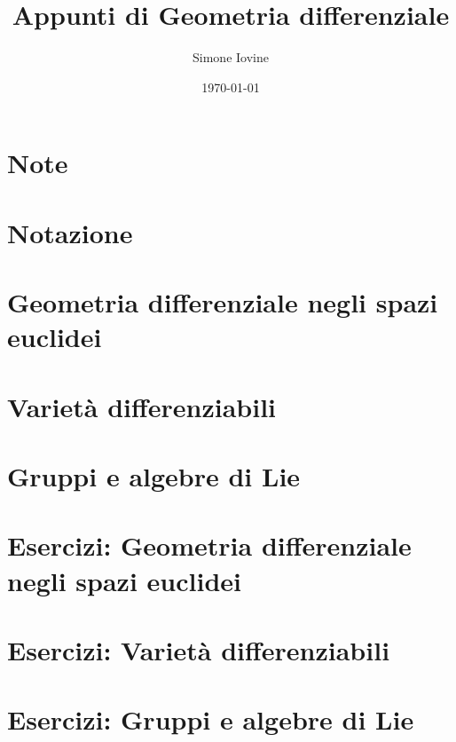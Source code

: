 \documentclass[12pt]{report}
\title{\textbf{Appunti di Geometria differenziale}}
\author{Simone Iovine}
\date{\today}
\makeatletter
\renewcommand{\@chapapp}{Capitolo}
\makeatother
\begin{document}
\maketitle

%


%

\tableofcontents

%

\chapter*{Note}


%

\chapter*{Notazione}


%

\newpage

%


%

\chapter{Geometria differenziale negli spazi euclidei}


%

\chapter{Varietà differenziabili}


%

\chapter{Gruppi e algebre di Lie}


%

\appendix

\makeatletter
\renewcommand{\@chapapp}{Esercizi}
\makeatother

\chapter{Esercizi: Geometria differenziale negli spazi euclidei}


%

\chapter{Esercizi: Varietà differenziabili}


%

\chapter{Esercizi: Gruppi e algebre di Lie}


%


\printbibliography[
	title={Bibliografia}
]
\end{document}

